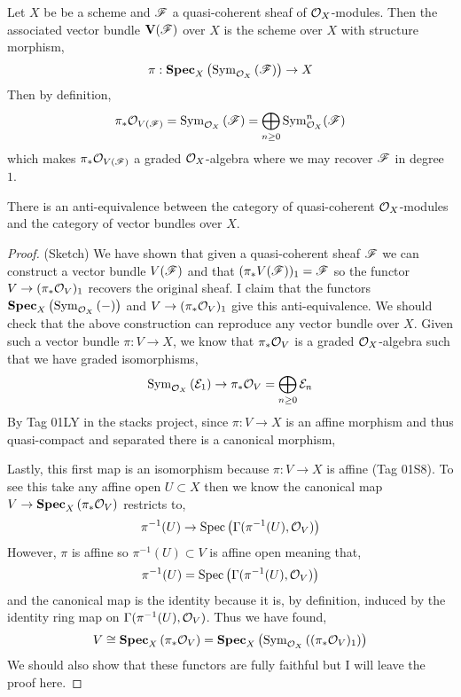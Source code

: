 \documentclass[12pt]{article}
\begin{document}
\begin{definition}
Let $X$ be be a scheme and $\mathscr{F}$ a quasi-coherent sheaf of $\mathcal{O}_{X}$-modules. Then the associated vector bundle $\mathbf{V}(\mathscr{F})$ over $X$ is the scheme over $X$ with structure morphism,
\[ \pi : \mathbf{Spec}_{X}\left( \mathrm{Sym}_{\mathcal{O}_{X}}\left( \mathscr{F} \right) \right) \to X \]
Then by definition,
\[ \pi_* \mathcal{O}_{V(\mathscr{F})} = \mathrm{Sym}_{\mathcal{O}_{X}}\left( \mathscr{F} \right) = \bigoplus_{n \ge 0} \mathrm{Sym}^n_{\mathcal{O}_{X}}(\mathscr{F}) \]
which makes $\pi_* \mathcal{O}_{V(\mathscr{F})}$ a graded $\mathcal{O}_{X}$-algebra where we may recover $\mathscr{F}$ in degree $1$.
\end{definition}

\begin{theorem}
There is an anti-equivalence between the category of quasi-coherent $\mathcal{O}_{X}$-modules and the category of vector bundles over $X$.
\end{theorem}

\begin{proof}
(Sketch) We have shown that given a quasi-coherent sheaf $\mathscr{F}$ we can construct a vector bundle $V(\mathscr{F})$ and that $(\pi_* V(\mathscr{F}))_1 = \mathscr{F}$ so the functor $V \to (\pi_* \mathcal{O}_{V})_1$ recovers the original sheaf. I claim that the functors $\mathbf{Spec}_{X}\left( \mathrm{Sym}_{\mathcal{O}_{X}}\left( - \right) \right)$ and $V \to (\pi_* \mathcal{O}_{V})_1$ give this anti-equivalence. We should check that the above construction can reproduce any vector bundle over $X$. Given such a vector bundle $\pi : V \to X$, we know that $\pi_* \mathcal{O}_{V}$ is a graded $\mathcal{O}_{X}$-algebra such that we have graded isomorphisms,
\[ \mathrm{Sym}_{\mathcal{O}_{X}}\left( \mathcal{E}_1 \right) \to \pi_* \mathcal{O}_{V} = \bigoplus_{n \ge 0} \mathcal{E}_n \]
By Tag 01LY in the stacks project, since $\pi : V \to X$ is an affine morphism and thus quasi-compact and separated there is a canonical morphism,
\begin{center}
\end{center}
Lastly, this first map is an isomorphism because $\pi : V \to X$ is affine (Tag 01S8). To see this take any affine open $U \subset X$ then we know the canonical map $V \to \mathbf{Spec}_{X}\left( \pi_* \mathcal{O}_{V} \right)$ restricts to,
\[ \pi^{-1}(U) \to \mathrm{Spec}\left( \Gamma(\pi^{-1}(U), \mathcal{O}_{V}) \right) \]
However, $\pi$ is affine so $\pi^{-1}(U) \subset V$ is affine open meaning that,
\[ \pi^{-1}(U) = \mathrm{Spec}\left( \Gamma(\pi^{-1}(U), \mathcal{O}_{V}) \right) \]
and the canonical map is the identity because it is, by definition, induced by the identity ring map on $\Gamma(\pi^{-1}(U), \mathcal{O}_{V})$. Thus we have found,
\[ V \cong \mathbf{Spec}_{X}\left( \pi_* \mathcal{O}_{V} \right) = \mathbf{Spec}_{X}\left( \mathrm{Sym}_{\mathcal{O}_{X}}\left( (\pi_* \mathcal{O}_{V})_1 \right) \right)  \]
 We should also show that these functors are fully faithful but I will leave the proof here.
\end{proof}
\end{document}
